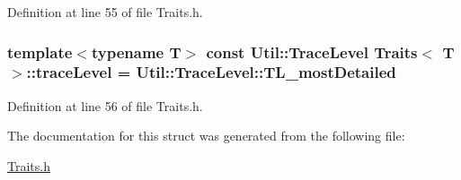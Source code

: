 Definition at line 55 of file Traits.\-h.

\hypertarget{struct_traits_a032499d15672915dd3349e6cc0e9c673}{
\subsubsection[{trace\-Level}]{\setlength{\rightskip}{0pt plus 5cm}template$<$typename T$>$ const {\bf Util\-::\-Trace\-Level} {\bf Traits}$<$ T $>$\-::trace\-Level = Util\-::\-Trace\-Level\-::\-T\-L\-\_\-most\-Detailed\hspace{0.3cm}{\ttfamily [static]}}}\label{struct_traits_a032499d15672915dd3349e6cc0e9c673}


Definition at line 56 of file Traits.\-h.



The documentation for this struct was generated from the following file\-:\begin{DoxyCompactItemize}
\item 
\hyperlink{_traits_8h}{Traits.\-h}\end{DoxyCompactItemize}
